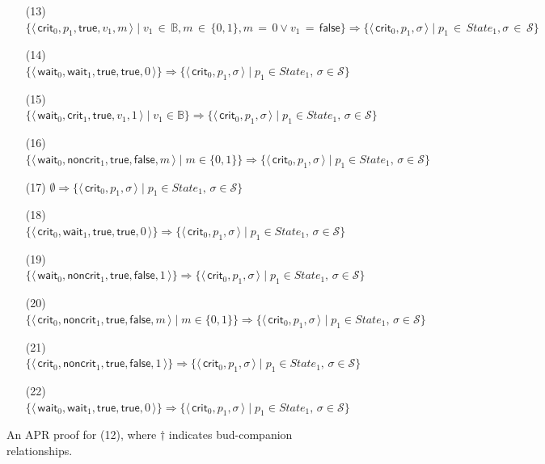 \documentclass[10pt,a4paper]{article}
\def\cS{\mathcal{S}}
\newcommand{\symb}[1]{\mathsf{#1}}
\newcommand{\ReachPred}[2]{#1 \Rightarrow #2}
\newcommand{\State}[1]{\langle\, #1 \,\rangle}
\newcommand{\StateSet}[1]{\mathit{State}_{#1}}
\begin{document}
\begin{figure}[t]
	\smallskip
	\setlength{\columnsep}{3pt}
	\footnotesize
	\begin{itemize}
		\leftskip=2ex
		\itemsep-1pt
		\item[(13)]
		      $\ReachPred{\{\State{\symb{crit}_0,p_1,\symb{true},v_1,m} \mid v_1 \,{\in}\, \mathbb{B},  m \,{\in}\, \{0,1\}, m\,{=}\,0 \lor v_1\,{=}\,\symb{false} \} }{ \{ \State{\symb{crit}_0,p_1,\sigma} \mid p_1 \,{\in}\, \StateSet{1}, \sigma \,{\in}\, \cS \}}$
		\item[(14)]
		      $\ReachPred{\{\State{\symb{wait}_0,\symb{wait}_1,\symb{true},\symb{true},0}\}}{\{ \State{\symb{crit}_0,p_1,\sigma} \mid p_1 \in \StateSet{1}, \, \sigma \in \cS \}}$
		\item[(15)]
		      $\ReachPred{\{\State{\symb{wait}_0,\symb{crit}_1,\symb{true},v_1,1} \mid v_1 \in \mathbb{B} \}}{\{ \State{\symb{crit}_0,p_1,\sigma} \mid p_1 \in \StateSet{1}, \, \sigma \in \cS \}}$
		\item[(16)]
		      $\ReachPred{\{\State{\symb{wait}_0,\symb{noncrit}_1,\symb{true},\symb{false},m} \mid m \in \{0,1\}\}}{\{ \State{\symb{crit}_0,p_1,\sigma} \mid p_1 \in \StateSet{1}, \, \sigma \in \cS \}}$
		\item[(17)]
		      $\ReachPred{\emptyset}{\{ \State{\symb{crit}_0,p_1,\sigma} \mid p_1 \in \StateSet{1}, \, \sigma \in \cS \}}$
		\item[(18)]
		      $\ReachPred{\{\State{\symb{crit}_0,\symb{wait}_1,\symb{true},\symb{true},0}\}}{\{ \State{\symb{crit}_0,p_1,\sigma} \mid p_1 \in \StateSet{1}, \, \sigma \in \cS \}}$
		\item[(19)]
		      $\ReachPred{\{\State{\symb{wait}_0,\symb{noncrit}_1,\symb{true},\symb{false},1}\}}{\{ \State{\symb{crit}_0,p_1,\sigma} \mid p_1 \in \StateSet{1}, \, \sigma \in \cS \}}$
		\item[(20)]
		      $\ReachPred{\{\State{\symb{crit}_0,\symb{noncrit}_1,\symb{true},\symb{false},m} \mid m \in \{0,1\}\}}{\{ \State{\symb{crit}_0,p_1,\sigma} \mid p_1 \in \StateSet{1}, \, \sigma \in \cS \}}$
		\item[(21)]
		      $\ReachPred{\{\State{\symb{crit}_0,\symb{noncrit}_1,\symb{true},\symb{false},1}\}}{\{ \State{\symb{crit}_0,p_1,\sigma} \mid p_1 \in \StateSet{1}, \, \sigma \in \cS \}}$
		\item[(22)]
		      $\ReachPred{\{\State{\symb{wait}_0,\symb{wait}_1,\symb{true},\symb{true},0}\}}{\{ \State{\symb{crit}_0,p_1,\sigma} \mid p_1 \in \StateSet{1}, \, \sigma \in \cS \}}$
	\end{itemize}
	\caption{An APR proof for (12), where $\dag$ indicates bud-companion relationships.}
	\label{fig:APR-proof}
\end{figure}
\end{document}
